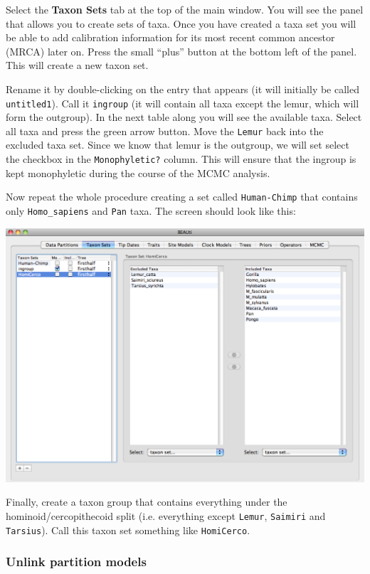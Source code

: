 \documentclass[12pt]{article}
\begin{document}
Select the {\bf Taxon Sets} tab at the top of the main window. You will see the
panel that allows you to create sets of taxa. Once you have created a taxa set you will be able to add calibration information for its most recent common
ancestor (MRCA) later on. Press the small ``plus''
button at the bottom left of the panel. This will create a new taxon
set. 

Rename it by double-clicking on the entry that appears (it will
initially be called \texttt{untitled1}). Call it \texttt{ingroup} (it will contain all taxa except the lemur, which will form the outgroup).
In the next table along you will see the available taxa. Select all taxa and press the green arrow button. Move the \texttt{Lemur} back into the excluded taxa set. Since we know that lemur is the outgroup, we will set select the checkbox in the \texttt{Monophyletic?} column. This will ensure that the ingroup is kept monophyletic during the course of the MCMC analysis.

Now repeat the whole procedure creating a set called \texttt{Human-Chimp}
that contains only \texttt{Homo\_sapiens} and \texttt{Pan}
taxa. The screen should look like this:

\medskip{}

\includegraphics[scale=0.4]{figures/BEAUti_TaxonSets}

\medskip{}


Finally, create a taxon group that contains everything under the hominoid/cercopithecoid split (i.e. everything except \texttt{Lemur}, \texttt{Saimiri} and \texttt{Tarsius}). Call this taxon set something like \texttt{HomiCerco}.

\subsubsection*{Unlink partition models}
\end{document}
